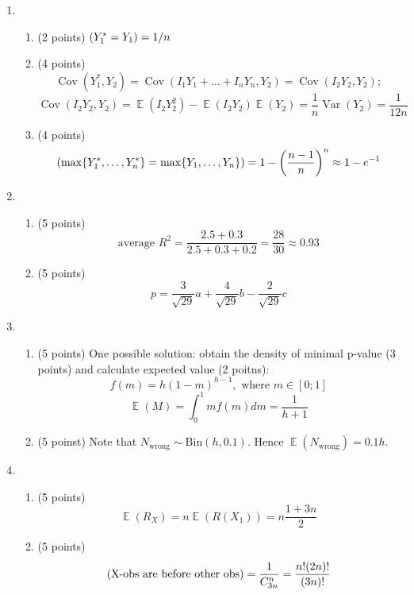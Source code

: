 \documentclass[11pt, a4paper]{article}
\DeclareMathOperator{\Var}{Var}
\DeclareMathOperator{\Cov}{Cov}
\DeclareMathOperator{\E}{\mathbb{E}}
\let\P\relax
\DeclareMathOperator{\P}{\mathbb{P}}
\theoremstyle{definition}
\begin{document}
\begin{enumerate}
    \item \begin{enumerate}
        \item (2 points) $\P(Y_1^* = Y_1) = 1/n$
        \item (4 points) 
        \[
        \Cov(Y_1^*, Y_2) = \Cov(I_1 Y_1 + \ldots + I_n Y_n, Y_2) = \Cov(I_2 Y_2, Y_2);    
        \] 
        \[
        \Cov(I_2 Y_2, Y_2) = \E(I_2 Y_2^2) - \E(I_2 Y_2)\E(Y_2) = \frac{1}{n}\Var(Y_2) = \frac{1}{12n}    
        \]
        \item (4 points)
        \[
        \P( \max\{Y_1^*, \ldots, Y_n^*\} = \max\{Y_1, \ldots, Y_n\}) = 1 - \left(\frac{n-1}{n}\right)^n \approx 1 - e^{-1}
        \]
    \end{enumerate}
    \item \begin{enumerate}
        \item (5 points) 
        \[
            \text{average }R^2 = \frac{2.5 + 0.3}{2.5 + 0.3 + 0.2} = \frac{28}{30} \approx 0.93
        \]
        \item (5 points)
        \[
        p = \frac{3}{\sqrt{29}}a + \frac{4}{\sqrt{29}}b - \frac{2}{\sqrt{29}}c    
        \]
    \end{enumerate}
    \item \begin{enumerate}
        \item (5 points) One possible solution: obtain the density of minimal p-value (3 points) and calculate expected value (2 poitns):
        \[
        f(m) = h (1 - m)^{h-1}, \text{ where } m \in [0;1]    
        \]
        \[
        \E(M) = \int_0^1 m f(m) dm = \frac{1}{h + 1}    
        \]
        \item (5 poinst) Note that $N_{\text{wrong}} \sim \mathrm{Bin}(h, 0.1)$. Hence $\E(N_{\text{wrong}}) = 0.1 h$.
    \end{enumerate}
    \item \begin{enumerate}
        \item (5 points)
        \[
        \E(R_X) = n \E(R(X_1)) = n \frac{1 + 3n}{2}    
        \]
        \item (5 points)
        \[
        \P(\text{X-obs are before other obs})  = \frac{1}{C_{3n}^n} = \frac{n!(2n)!}{(3n)!}   
        \]
    \end{enumerate}
\end{enumerate}
\end{document}
